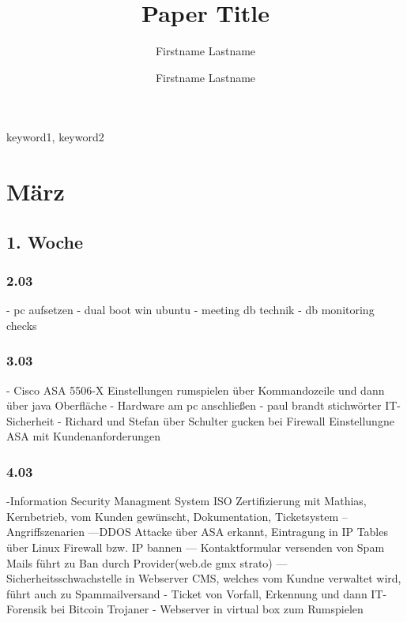 \documentclass[english,runningheads,a4paper]{llncs}[2018/03/10]
\begin{document}
\title{Paper Title}

\author{Firstname Lastname \and Firstname Lastname}

%
%

\maketitle

\begin{abstract}
  \lipsum[1]
\end{abstract}

\begin{keywords}
  keyword1, keyword2
\end{keywords}

\section{März}
\subsection{1. Woche}
\subsubsection{2.03}
- pc aufsetzen
- dual boot win ubuntu
- meeting db technik
- db monitoring checks

\subsubsection{3.03}
- Cisco ASA 5506-X Einstellungen rumspielen über Kommandozeile und dann über java Oberfläche
- Hardware am pc anschließen
- paul brandt stichwörter IT-Sicherheit
- Richard und Stefan über Schulter gucken bei Firewall Einstellungne ASA mit Kundenanforderungen

\subsubsection{4.03}
-Information Security Managment System ISO Zertifizierung mit Mathias, Kernbetrieb, vom Kunden gewünscht, Dokumentation, Ticketsystem
-- Angriffszenarien 
---DDOS Attacke über ASA erkannt, Eintragung in IP Tables über Linux Firewall bzw. IP bannen
--- Kontaktformular versenden von Spam Mails führt zu Ban durch Provider(web.de gmx strato)
--- Sicherheitsschwachstelle in Webserver CMS, welches vom Kundne verwaltet wird, führt auch zu Spammailversand
- Ticket von Vorfall, Erkennung und dann IT-Forensik bei Bitcoin Trojaner
- Webserver in virtual box zum Rumspielen
\end{document}
